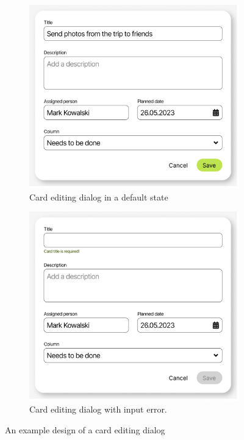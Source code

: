 \begin{figure}
    \centering
    \begin{subfigure}[m]{0.45\textwidth}
        \centering
        \includegraphics[width=\textwidth]{./3-research-methodology/card-dialog}
        \caption{Card editing dialog in a default state}
        \label{fig:3-4-card-dialog-default}
    \end{subfigure}
    \hfill
    \begin{subfigure}[m]{0.45\textwidth}
        \centering
        \includegraphics[width=\textwidth]{./3-research-methodology/card-dialog-with-error}
        \caption{Card editing dialog with input error.}
        \label{fig:3-4-card-dialog-with-error}
    \end{subfigure}
    \caption{An example design of a card editing dialog}
    \label{fig:3-4-card-dialog}
\end{figure}

